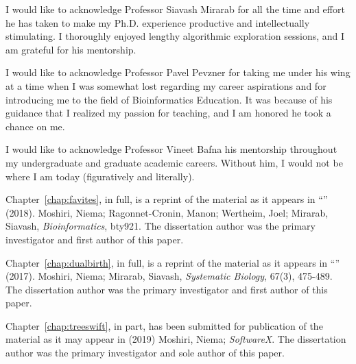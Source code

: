 \begin{frontmatter}
\tableofcontents

\newpage
{}
\begin{center}\expandafter\MakeUppercase\expandafter{\abbrevtitle}\end{center}
\let\clearpage\relax
\vspace*{-2cm}
\printglossary[type=\acronymtype,title={}]


\listoffigures
\listoftables


\begin{acknowledgements}
I would like to acknowledge Professor Siavash Mirarab for all the time and effort he has taken to make my Ph.D. experience productive and intellectually stimulating. I thoroughly enjoyed lengthy algorithmic exploration sessions, and I am grateful for his mentorship.

I would like to acknowledge Professor Pavel Pevzner for taking me under his wing at a time when I was somewhat lost regarding my career aspirations and for introducing me to the field of Bioinformatics Education. It was because of his guidance that I realized my passion for teaching, and I am honored he took a chance on me.

I would like to acknowledge Professor Vineet Bafna his mentorship throughout my undergraduate and graduate academic careers. Without him, I would not be where I am today (figuratively and literally).

Chapter~\ref{chap:favites}, in full, is a reprint of the material as it appears in ``\favitestitle'' (2018). Moshiri, Niema; Ragonnet-Cronin, Manon; Wertheim, Joel; Mirarab, Siavash, \textit{Bioinformatics}, bty921. The dissertation author was the primary investigator and first author of this paper.

Chapter~\ref{chap:dualbirth}, in full, is a reprint of the material as it appears in ``\dualbirthtitle'' (2017). Moshiri, Niema; Mirarab, Siavash, \textit{Systematic Biology}, 67(3), 475-489. The dissertation author was the primary investigator and first author of this paper.

Chapter~\ref{chap:treeswift}, in part, has been submitted for publication of the material as it may appear in (2019) Moshiri, Niema; \textit{SoftwareX}. The dissertation author was the primary investigator and sole author of this paper. 
\end{acknowledgements}


\end{frontmatter}
